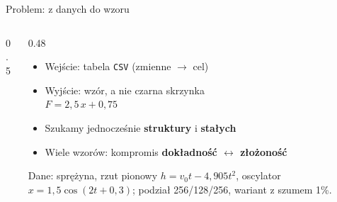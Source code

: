 \documentclass[aspectratio=169,11pt]{beamer}
\begin{document}
\begin{frame}{Problem: z danych do wzoru}
  \begin{columns}[c]
    \begin{column}{0.5\textwidth}
    \end{column}
    \begin{column}{0.48\textwidth}
      \begin{itemize}
        \item Wejście: tabela \texttt{CSV} (zmienne $\rightarrow$ cel)
        \item Wyjście: \alert{wzór}, a nie czarna skrzynka\\[2pt]
          \hspace*{1em}$F = 2{,}5\,x + 0{,}75$
        \item Szukamy jednocześnie \textbf{struktury} i \textbf{stałych}
        \item Wiele wzorów: kompromis \textbf{dokładność $\leftrightarrow$ złożoność}
      \end{itemize}
      \medskip
      {\small\color{muted}Dane: sprężyna, rzut pionowy $h=v_0t-4{,}905t^2$, oscylator $x=1{,}5\cos(2t+0{,}3)$;
      podział 256/128/256, wariant z szumem 1\%.}
    \end{column}
  \end{columns}
\end{frame}
\end{document}
